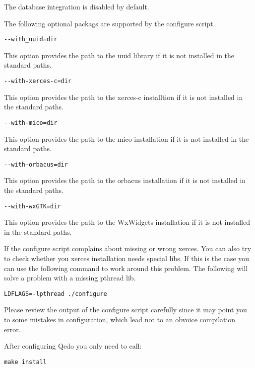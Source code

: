 \documentclass[12pt,a4paper]{report}
\begin{document}
The database integration is disabled by default.


The following optional packags are supported by the configure script.

\begin{verbatim}
--with_uuid=dir
\end{verbatim}

This option provides the path to the uuid library if it is not installed in the standard paths.

\begin{verbatim}
--with-xerces-c=dir
\end{verbatim}

This option provides the path to the xerces-c installtion if it is not installed in the standard paths.

\begin{verbatim}
--with-mico=dir
\end{verbatim}

This option provides the path to the mico installation if it is not installed in the standard paths.

\begin{verbatim}
--with-orbacus=dir
\end{verbatim}

This option provides the path to the orbacus installation if it is not installed in the standard paths.

\begin{verbatim}
--with-wxGTK=dir
\end{verbatim}

This option provides the path to the WxWidgets installation if it is not installed in the standard paths.

If the configure script complains about missing or wrong xerces. You can also try to check whether you xerces installation needs special libs. If this is the case you can use the following command to work around this problem. The following will solve a problem with a missing pthread lib.

\begin{verbatim}
LDFLAGS=-lpthread ./configure
\end{verbatim}

Please review the output of the configure script carefully since it may point you to some mistakes in configuration, which lead not to an obvoice compilation error.

After configuring Qedo you only need to call:
\begin{verbatim}
make install
\end{verbatim}
\end{document}
